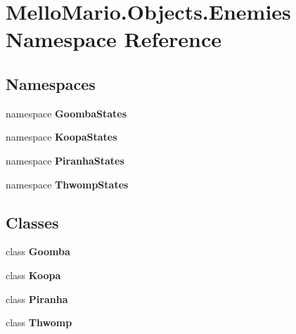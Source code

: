 \section{Mello\+Mario.\+Objects.\+Enemies Namespace Reference}
\label{namespaceMelloMario_1_1Objects_1_1Enemies}
\subsection*{Namespaces}
\begin{DoxyCompactItemize}
\item 
namespace \textbf{ Goomba\+States}
\item 
namespace \textbf{ Koopa\+States}
\item 
namespace \textbf{ Piranha\+States}
\item 
namespace \textbf{ Thwomp\+States}
\end{DoxyCompactItemize}
\subsection*{Classes}
\begin{DoxyCompactItemize}
\item 
class \textbf{ Goomba}
\item 
class \textbf{ Koopa}
\item 
class \textbf{ Piranha}
\item 
class \textbf{ Thwomp}
\end{DoxyCompactItemize}
